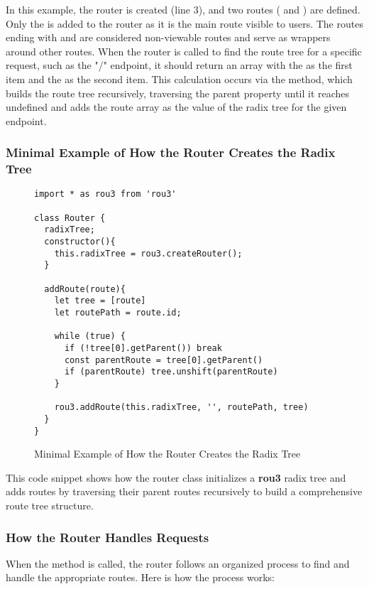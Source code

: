 In this example, the router is created (line 3), and two routes ( and ) are defined. Only the  is added to the router as it is the main route visible to users. The routes ending with  and  are considered non-viewable routes and serve as wrappers around other routes. When the router is called to find the route tree for a specific request, such as the "/" endpoint, it should return an array with the  as the first item and the  as the second item. This calculation occurs via the  method, which builds the route tree recursively, traversing the parent property until it reaches undefined and adds the route array as the value of the radix tree for the given endpoint.

\pagebreak

\subsubsection*{Minimal Example of How the Router Creates the Radix Tree}
\begin{figure}[h!]
\begin{verbatim}
import * as rou3 from 'rou3'

class Router {
  radixTree;
  constructor(){
    this.radixTree = rou3.createRouter();
  }

  addRoute(route){
    let tree = [route]
    let routePath = route.id;

    while (true) {
      if (!tree[0].getParent()) break
      const parentRoute = tree[0].getParent()
      if (parentRoute) tree.unshift(parentRoute)
    }

    rou3.addRoute(this.radixTree, '', routePath, tree)
  }
}
\end{verbatim}
\caption{Minimal Example of How the Router Creates the Radix Tree}
\end{figure}

This code snippet shows how the router class initializes a \textbf{rou3} radix tree and adds routes by traversing their parent routes recursively to build a comprehensive route tree structure.





\subsubsection{How the Router Handles Requests}

When the  method is called, the router follows an organized process to find and handle the appropriate routes. Here is how the process works:

